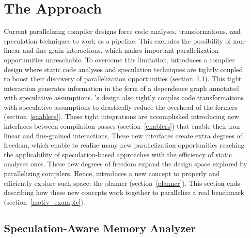 \section{The \name Approach}

Current parallelizing compiler designs force code analyses, transformations, and speculation techniques to work as a pipeline.
This excludes the possibility of non-linear and fine-grain interactions, which makes important parallelization opportunities unreachable.
To overcome this limitation, \name introduces a compiler design where static code analyses and speculation techniques are tightly coupled to boost their discovery of parallelization opportunities (section~\ref{analyzer}).
This tight interaction generates information in the form of a dependence graph annotated with speculative assumptions.
\name's design also tightly couples code transformations with speculative assumptions to drastically reduce the overhead of the formers (section~\ref{enablers}).
These tight integrations are accomplished introducing new interfaces between compilation passes (section~\ref{enablers}) that enable their non-linear and fine-grained interactions.
These new interfaces create extra degrees of freedom, which enable \name to realize many new parallelization opportunities reaching the applicability of speculation-based approaches with the efficiency of static analyses ones.
These new degrees of freedom expand the design space explored by parallelizing compilers.
Hence, \name introduces a new concept to properly and efficiently explore such space: the planner (section~\ref{planner}).
This section ends describing how these new concepts work together to parallelize a real benchmark (section~\ref{motiv_example}).



\subsection{Speculation-Aware Memory Analyzer}
\label{analyzer}

